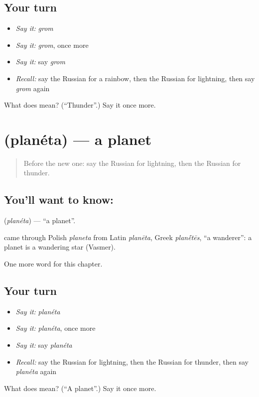 \subsection*{Your turn}
\begin{itemize}
\raggedright
  \item \emph{Say it:} \emph{grom}
  \item \emph{Say it:} \emph{grom}, once more
  \item \emph{Say it:} say \emph{grom}
  \item \emph{Recall:} say the Russian for a rainbow, then the Russian for lightning, then say \emph{grom} again
\end{itemize}

\begin{tcolorbox}[breakable,colback=teal!4,colframe=teal!35!black,title={Before you move on}]
What does  mean? (\textquotedblleft{}Thunder\textquotedblright{}.) Say it once more.
\end{tcolorbox}
\section[\texorpdfstring{\ru{планета} (planéta)}{планета (planéta)}]{ (planéta) — a planet}

\label{lesson:RU-C122-planet}



\begin{quote}
Before the new one: say the Russian for lightning, then the Russian for thunder.
\end{quote}

\subsection*{You'll want to know: }
\textbf{} (\emph{planéta}) — \textquotedblleft{}a planet\textquotedblright{}.

\begin{cousinweb}
\textbf{} came through Polish \emph{planeta} from Latin \emph{planēta}, Greek \emph{plan\'{\={e}}tēs}, \textquotedblleft{}a wanderer\textquotedblright{}: a planet is a wandering star (Vasmer).
\end{cousinweb}

\begin{grammarlens}[title={What you've built}]
One more word for this chapter.
\end{grammarlens}

\subsection*{Your turn}
\begin{itemize}
\raggedright
  \item \emph{Say it:} \emph{planéta}
  \item \emph{Say it:} \emph{planéta}, once more
  \item \emph{Say it:} say \emph{planéta}
  \item \emph{Recall:} say the Russian for lightning, then the Russian for thunder, then say \emph{planéta} again
\end{itemize}

\begin{tcolorbox}[breakable,colback=teal!4,colframe=teal!35!black,title={Before you move on}]
What does  mean? (\textquotedblleft{}A planet\textquotedblright{}.) Say it once more.
\end{tcolorbox}
